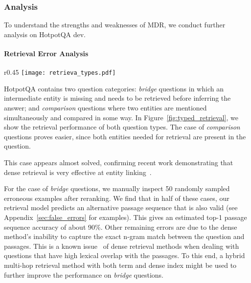 \documentclass{article} \usepackage{iclr2021_conference,times}
\newcommand{\method}{MDR\xspace}
\begin{document}
\subsubsection{Analysis}
\label{sec:retrieval_analysis}
\label{sec:error_analysis}

To understand the strengths and weaknesses of \method, we conduct further analysis on HotpotQA dev. 

\paragraph{Retrieval Error Analysis}

\begin{wrapfigure}{r}{0.45\textwidth}
\texttt{[image: retrieva\_types.pdf]}
\vspace{-20pt}
\caption{The retrieval performance gap between comparison and bridge questions. Left: recall of groundtruth passage sequences without reranking. Right: Top-1 chain exact match after reranking.}
\vspace{-10pt}
\label{fig:typed_retrieval}
\end{wrapfigure}

HotpotQA contains two question categories: \emph{bridge} questions in which an intermediate entity is missing and needs to be retrieved before inferring the answer; and \emph{comparison} questions where two entities are mentioned simultaneously and compared in some way. In Figure~\ref{fig:typed_retrieval}, we show the retrieval performance of both question types.  The case of \textit{comparison} questions proves easier, since both entities needed for retrieval are present in the question. 

This case appears almost solved, confirming recent work demonstrating that dense retrieval is very effective at entity linking~\citep{blink}.



For the case of \textit{bridge} questions, we manually inspect 50 randomly sampled erroneous examples after reranking. We find that in half of these cases, our retrieval model predicts an alternative passage sequence that is also valid (see Appendix~\ref{sec:false_errors} for examples). This gives an estimated top-1 passage sequence accuracy of about 90\%. 
Other remaining errors are due to the dense method's inability to capture the exact n-gram match between the question and passages. This is a known issue~\citep{ORQA, DPR} of dense retrieval methods when dealing with questions that have high lexical overlap with the passages. To this end, a hybrid multi-hop retrieval method with both term and dense index might be used to further improve the performance on \textit{bridge} questions. 
\end{document}
